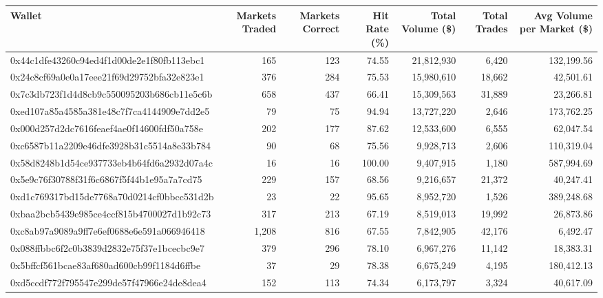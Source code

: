 \documentclass[11pt,a4paper]{article}
\newcommand{\edit}[1]{#1}
\begin{document}
\begin{table}[H]
\centering

\scriptsize
\setlength{\tabcolsep}{4pt}
\begin{adjustbox}{max width=\textwidth}
\begin{tabular}{lrrrrrr}
\toprule
Wallet & Markets Traded & Markets Correct & Hit Rate (\%) & Total Volume (\$) & Total Trades & Avg Volume per Market (\$) \\
\midrule
0x44c1dfe43260c94ed4f1d00de2e1f80fb113ebc1 & 165 & 123 & 74.55 & 21,812,930 & 6,420 & 132,199.56 \\
0x24c8cf69a0e0a17eee21f69d29752bfa32e823e1 & 376 & 284 & 75.53 & 15,980,610 & 18,662 & 42,501.61 \\
0x7c3db723f1d4d8cb9c550095203b686cb11e5c6b & \edit{658} & 437 & \edit{66.41} & \edit{15,309,563} & \edit{31,889} & \edit{23,266.81} \\
0xed107a85a4585a381e48c7f7ca4144909e7dd2e5 & 79 & 75 & 94.94 & 13,727,220 & 2,646 & 173,762.25 \\
0x000d257d2dc7616feaef4ae0f14600fdf50a758e & 202 & 177 & 87.62 & 12,533,600 & 6,555 & 62,047.54 \\
0xc6587b11a2209e46dfe3928b31c5514a8e33b784 & 90 & 68 & 75.56 & 9,928,713 & 2,606 & 110,319.04 \\
0x58d8248b1d54ce937733eb4b64fd6a2932d07a4c & 16 & 16 & 100.00 & 9,407,915 & 1,180 & 587,994.69 \\
0x5e9c76f30788f31f6c6867f5f44b1e95a7a7cd75 & 229 & 157 & 68.56 & 9,216,657 & 21,372 & 40,247.41 \\
0xd1c769317bd15de7768a70d0214cf0bbcc531d2b & 23 & 22 & 95.65 & 8,952,720 & 1,526 & 389,248.68 \\
0xbaa2bcb5439e985ce4ccf815b4700027d1b92c73 & 317 & 213 & 67.19 & 8,519,013 & 19,992 & 26,873.86 \\
0xc8ab97a9089a9ff7e6ef0688e6e591a066946418 & \edit{1,208} & \edit{816} & \edit{67.55} & \edit{7,842,905} & \edit{42,176} & \edit{6,492.47} \\
0x088ffbbc6f2c0b3839d2832e75f37e1bcecbc9e7 & 379 & 296 & 78.10 & 6,967,276 & 11,142 & 18,383.31 \\
0x5bffcf561bcae83af680ad600cb99f1184d6ffbe & 37 & 29 & 78.38 & 6,675,249 & 4,195 & 180,412.13 \\
0xd5ccdf772f795547e299de57f47966e24de8dea4 & 152 & 113 & 74.34 & 6,173,797 & 3,324 & 40,617.09 \\

\end{tabular}
\end{adjustbox}
\end{table}
\end{document}
